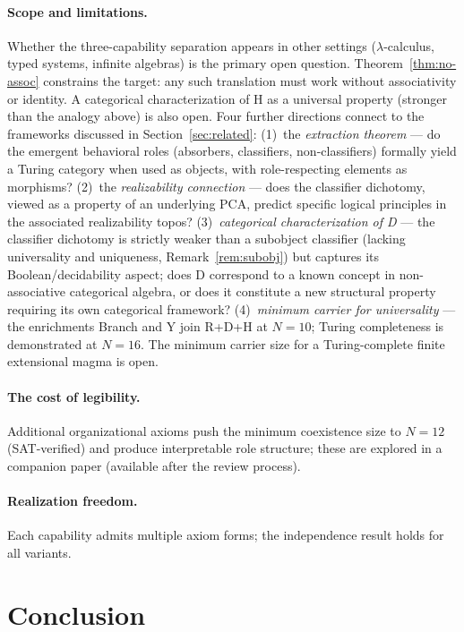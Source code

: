 \documentclass[sigconf,screen,review,anonymous]{acmart}
\theoremstyle{remark}
\begin{document}
\paragraph{Scope and limitations.}
Whether the three-capability separation appears in other settings ($\lambda$-calculus, typed systems, infinite algebras) is the primary open question. Theorem~\ref{thm:no-assoc} constrains the target: any such translation must work without associativity or identity. A categorical characterization of H as a universal property (stronger than the analogy above) is also open. Four further directions connect to the frameworks discussed in Section~\ref{sec:related}: (1)~the \emph{extraction theorem} --- do the emergent behavioral roles (absorbers, classifiers, non-classifiers) formally yield a Turing category when used as objects, with role-respecting elements as morphisms? (2)~the \emph{realizability connection} --- does the classifier dichotomy, viewed as a property of an underlying PCA, predict specific logical principles in the associated realizability topos? (3)~\emph{categorical characterization of D} --- the classifier dichotomy is strictly weaker than a subobject classifier (lacking universality and uniqueness, Remark~\ref{rem:subobj}) but captures its Boolean/decidability aspect; does D correspond to a known concept in non-associative categorical algebra, or does it constitute a new structural property requiring its own categorical framework? (4)~\emph{minimum carrier for universality} --- the enrichments Branch and Y join R+D+H at $N\!=\!10$; Turing completeness is demonstrated at $N\!=\!16$. The minimum carrier size for a Turing-complete finite extensional magma is open.

\paragraph{The cost of legibility.}
Additional organizational axioms push the minimum coexistence size to $N\!=\!12$ (SAT-verified) and produce interpretable role structure; these are explored in a companion paper (available after the review process).

\paragraph{Realization freedom.}
Each capability admits multiple axiom forms; the independence result holds for all variants.

\section{Conclusion}
\end{document}
